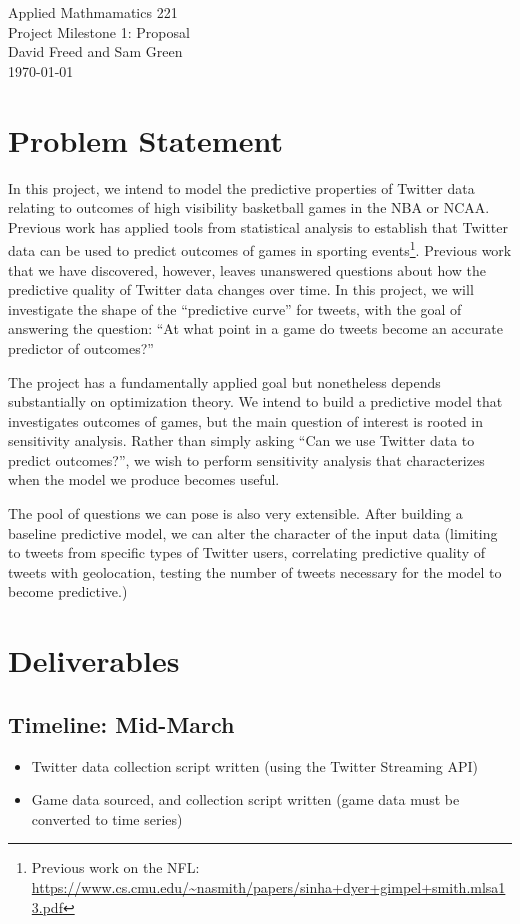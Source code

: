 \documentclass[12pt]{article}
\begin{document}
\begin{center}
{\Large Applied Mathmamatics 221}\\
Project Milestone 1: Proposal\\
David Freed and Sam Green\\
\today
\end{center}

\section{Problem Statement}

In this project, we intend to model the predictive properties of Twitter data relating to outcomes of high visibility basketball games in the NBA or NCAA. Previous work has applied tools from statistical analysis to establish that Twitter data can be used to predict outcomes of games in sporting events\footnote{Previous work on the NFL: \url{https://www.cs.cmu.edu/~nasmith/papers/sinha+dyer+gimpel+smith.mlsa13.pdf}}. Previous work that we have discovered, however, leaves unanswered questions about how the predictive quality of Twitter data changes over time. In this project, we will investigate the shape of the ``predictive curve'' for tweets, with the goal of answering the question: ``At what point in a game do tweets become an accurate predictor of outcomes?''

The project has a fundamentally applied goal but nonetheless depends substantially
on optimization theory. We intend to build a predictive model that investigates
outcomes of games, but the main question of interest is rooted in sensitivity
analysis. Rather than simply asking ``Can we use Twitter data to predict outcomes?'',
we wish to perform sensitivity analysis that characterizes when the model 
we produce becomes useful. 

The pool of questions we can pose is also very extensible. After building 
a baseline predictive model, we can alter the character of the input data
(limiting to tweets from specific types of Twitter users, correlating predictive
quality of tweets with geolocation, testing the number of tweets necessary 
for the model to become predictive.) 

\section{Deliverables}

\subsection{Timeline: Mid-March}  
\begin{itemize}
\item Twitter data collection script written (using the Twitter Streaming API)
\item Game data sourced, and collection script written (game data must be converted to time series)
\end{itemize} 
\end{document}
